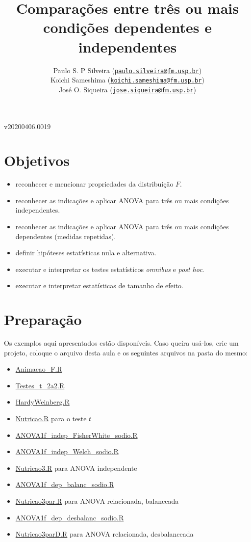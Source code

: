\documentclass[]{article}
\title{Comparações entre três ou mais condições dependentes e independentes}
\author{Paulo S. P Silveira
(\href{mailto:paulo.silveira@fm.usp.br}{\nolinkurl{paulo.silveira@fm.usp.br}})\\
Koichi Sameshima
(\href{mailto:koichi.sameshima@fm.usp.br}{\nolinkurl{koichi.sameshima@fm.usp.br}})\\
José O. Siqueira
(\href{mailto:jose.siqueira@fm.usp.br}{\nolinkurl{jose.siqueira@fm.usp.br}})}
\date{}
\providecommand{\tightlist}{%
  \setlength{\itemsep}{0pt}\setlength{\parskip}{0pt}}
\begin{document}
\maketitle

{
\setcounter{tocdepth}{4}
\tableofcontents
}
v20200406.0019

\section{Objetivos}\label{objetivos}

\begin{itemize}
\tightlist
\item
  reconhecer e mencionar propriedades da distribuição \(F\).
\item
  reconhecer as indicações e aplicar ANOVA para três ou mais condições
  independentes.
\item
  reconhecer as indicações e aplicar ANOVA para três ou mais condições
  dependentes (medidas repetidas).
\item
  definir hipóteses estatísticas nula e alternativa.
\item
  executar e interpretar os testes estatísticos \emph{omnibus} e
  \emph{post hoc}.
\item
  executar e interpretar estatísticas de tamanho de efeito.
\end{itemize}

\section{Preparação}\label{preparacao}

Os exemplos aqui apresentados estão disponíveis. Caso queira usá-los,
crie um projeto, coloque o arquivo desta aula e os seguintes arquivos na
pasta do mesmo:

\begin{itemize}
\tightlist
\item
  \url{Animacao_F.R}
\item
  \url{Testes_t_2a2.R}
\item
  \url{HardyWeinberg.R}
\item
  \url{Nutricao.R} para o teste \(t\)
\item
  \url{ANOVA1f_indep_FisherWhite_sodio.R}
\item
  \url{ANOVA1f_indep_Welch_sodio.R}
\item
  \url{Nutricao3.R} para ANOVA independente
\item
  \url{ANOVA1f_dep_balanc_sodio.R}
\item
  \url{Nutricao3par.R} para ANOVA relacionada, balanceada
\item
  \url{ANOVA1f_dep_desbalanc_sodio.R}
\item
  \url{Nutricao3parD.R} para ANOVA relacionada, desbalanceada
\end{itemize}
\end{document}
